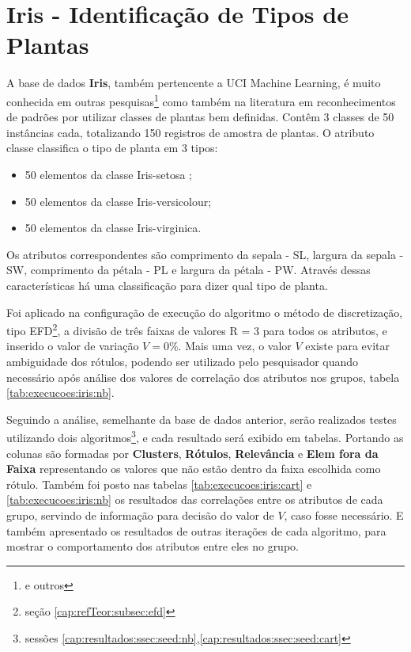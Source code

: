 \section{Iris - Identificação de Tipos de Plantas}


A base de dados \textbf{Iris}, também pertencente a UCI Machine Learning, é muito conhecida em outras pesquisas\footnote{\cite{LOPES2014,kotsiantis2005logitboost,Filho2015} e outros} como também na literatura em reconhecimentos de padrões por utilizar classes de plantas bem definidas. Contêm 3 classes de 50 instâncias cada, totalizando  150 registros de amostra de plantas. O atributo classe classifica o tipo de planta em 3 tipos:

\begin{itemize}[noitemsep]
 \item 50 elementos da classe Iris-setosa ;
 \item 50 elementos da classe Iris-versicolour;
 \item 50 elementos da classe Iris-virginica.
\end{itemize}

Os atributos correspondentes são comprimento da sepala - SL, largura da sepala - SW, comprimento da pétala - PL e
largura da pétala - PW. Através dessas características há uma classificação para dizer qual tipo de planta.

Foi aplicado na configuração de execução do algoritmo o método de discretização, tipo EFD\footnote{seção \ref{cap:refTeor:subsec:efd}}, a divisão de três faixas de valores R = 3 para todos os atributos, e inserido o valor de variação ${V=0\%}$. Mais uma vez, o valor ${V}$ existe para evitar ambiguidade dos rótulos, podendo ser utilizado pelo pesquisador quando necessário após análise dos valores de correlação dos atributos nos grupos, tabela \ref{tab:execucoes:iris:nb}.

Seguindo a análise, semelhante da base de dados anterior, serão realizados testes utilizando dois algoritmos\footnote{sessões \ref{cap:resultados:ssec:seed:nb},\ref{cap:resultados:ssec:seed:cart}}, e cada resultado será exibido em tabelas. Portando as colunas são formadas por \textbf{Clusters}, \textbf{Rótulos}, \textbf{Relevância} e \textbf{Elem fora da Faixa} representando os valores que não estão dentro da faixa escolhida como rótulo. Também foi posto nas tabelas \ref{tab:execucoes:iris:cart} e \ref{tab:execucoes:iris:nb} os resultados das correlações entre os atributos de cada grupo, servindo de informação para decisão do valor de ${V}$, caso fosse necessário. E também apresentado os resultados de outras iterações de cada algoritmo, para mostrar o comportamento dos atributos entre eles no grupo.

